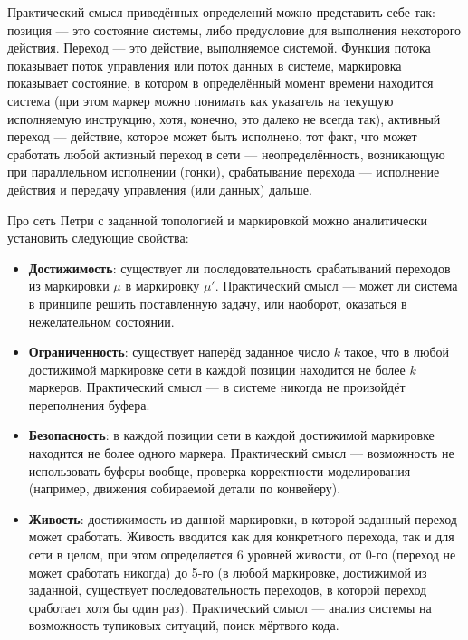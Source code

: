 \documentclass[conference]{IEEEtran}
\begin{document}
Практический смысл приведённых определений можно представить себе так: позиция --- 
это состояние системы, либо предусловие для выполнения некоторого действия. 
Переход --- это действие, выполняемое системой. Функция потока показывает поток 
управления или поток данных в системе, маркировка показывает состояние, в котором 
в определённый момент времени находится система (при этом маркер можно понимать 
как указатель на текущую исполняемую инструкцию, хотя, конечно, это далеко не 
всегда так), активный переход --- действие, которое может быть исполнено, тот 
факт, что может сработать любой активный переход в сети --- неопределённость, 
возникающую при параллельном исполнении (гонки), срабатывание перехода --- 
исполнение действия и передачу управления (или данных) дальше.

Про сеть Петри с заданной топологией и маркировкой можно аналитически установить 
следующие свойства:
\begin{itemize}
  \item \textbf{Достижимость}: существует ли последовательность срабатываний переходов из 
    маркировки $\mu$ в маркировку $\mu'$. Практический смысл --- может ли система 
    в принципе решить поставленную задачу, или наоборот, оказаться в нежелательном 
    состоянии.
  \item \textbf{Ограниченность}: существует наперёд заданное число $k$ такое, что в любой 
    достижимой маркировке сети в каждой позиции находится не более $k$ маркеров. 
    Практический смысл --- в системе никогда не произойдёт переполнения буфера.
  \item \textbf{Безопасность}: в каждой позиции сети в каждой достижимой маркировке 
    находится не более одного маркера. Практический смысл --- возможность не 
    использовать буферы вообще, проверка корректности моделирования (например, 
    движения собираемой детали по конвейеру).
  \item \textbf{Живость}: достижимость из данной маркировки, в которой заданный 
    переход может сработать. Живость вводится как для конкретного перехода, так 
    и для сети в целом, при этом определяется 6 уровней живости, от 0-го (переход 
    не может сработать никогда) до 5-го (в любой маркировке, достижимой из 
    заданной, существует последовательность переходов, в которой переход сработает 
    хотя бы один раз). Практический смысл --- анализ системы на возможность 
    тупиковых ситуаций, поиск мёртвого кода.
\end{itemize}
\end{document}
